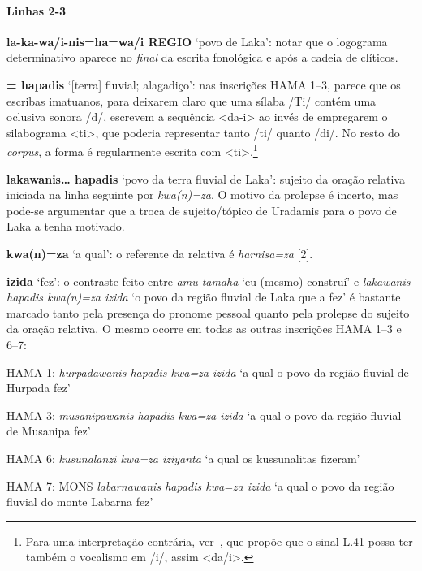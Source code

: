 \paragraph{Linhas 2-3}
\textbf{la-ka-wa/i-nis=ha=wa/i REGIO} `povo de Laka': notar que o logograma
determinativo aparece no \emph{final} da escrita fonológica e após a cadeia de
clíticos.

\noindent{} \textbf{= hapadis} `[terra] fluvial;
alagadiço': nas inscrições HAMA 1--3, parece que os escribas imatuanos,
para deixarem claro que uma sílaba /Ti/ contém uma oclusiva sonora /d/,
escrevem a sequência  <da-i> ao invés de empregarem o
silabograma  <ti>, que poderia representar tanto /ti/ quanto
/di/. No resto do \emph{corpus}, a forma é regularmente escrita com
 <ti>.\footnote{
	Para uma interpretação contrária, ver~\citet{Simon2019}, que propõe que o
	sinal L.41 possa ter também o vocalismo em /i/, assim <da/i>.
}

\noindent\textbf{lakawanis\ldots{} hapadis} `povo da terra fluvial de Laka': sujeito da
oração relativa iniciada na linha seguinte por \emph{kwa{(n)}=za}.
O motivo da prolepse é incerto, mas pode-se argumentar que a troca de
sujeito\slash{}tópico de Uradamis para o povo de Laka a tenha motivado.

\noindent\textbf{kwa{(n)}=za} `a qual': o referente da relativa é \emph{harnisa=za}
[2].

\noindent\textbf{izida} `fez': o contraste feito entre \emph{amu tamaha} `eu (mesmo)
construí' e \emph{lakawanis hapadis kwa{(n)}=za izida} `o povo da região
fluvial de Laka que a fez' é bastante marcado tanto pela presença do pronome
pessoal quanto pela prolepse do sujeito da oração relativa.
O mesmo ocorre em todas as outras inscrições HAMA 1--3 e 6--7:
\begin{compactitem}
	\item HAMA 1: \emph{hurpadawanis hapadis kwa=za izida} `a qual o povo da região
	fluvial de Hurpada fez'
	\item HAMA 3: \emph{musanipawanis hapadis kwa=za izida} `a qual o povo da região
	fluvial de Musanipa fez'
	\item HAMA 6: \emph{kusunalanzi kwa=za iziyanta} `a qual os kussunalitas fizeram'
	\item HAMA 7: MONS \emph{labarnawanis hapadis kwa=za izida} `a qual o
	povo da região fluvial do monte Labarna fez'
\end{compactitem}

